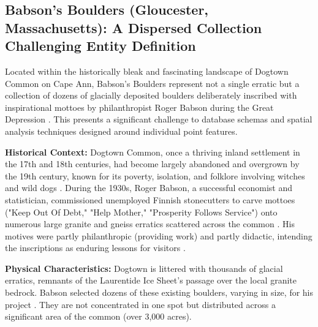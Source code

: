 \subsection{Babson's Boulders (Gloucester, Massachusetts): A Dispersed Collection Challenging Entity Definition}
\label{subsec:babson}

Located within the historically bleak and fascinating landscape of Dogtown Common on Cape Ann, Babson's Boulders represent not a single erratic but a collection of dozens of glacially deposited boulders deliberately inscribed with inspirational mottoes by philanthropist Roger Babson during the Great Depression \cite{Moore2005, wburMysteriousBoulders}. This presents a significant challenge to database schemas and spatial analysis techniques designed around individual point features.

\textbf{Historical Context:} Dogtown Common, once a thriving inland settlement in the 17th and 18th centuries, had become largely abandoned and overgrown by the 19th century, known for its poverty, isolation, and folklore involving witches and wild dogs \cite{Moore2005, Babson1940}. During the 1930s, Roger Babson, a successful economist and statistician, commissioned unemployed Finnish stonecutters to carve mottoes ("Keep Out Of Debt," "Help Mother," "Prosperity Follows Service") onto numerous large granite and gneiss erratics scattered across the common \cite{wburMysteriousBoulders}. His motives were partly philanthropic (providing work) and partly didactic, intending the inscriptions as enduring lessons for visitors \cite{Moore2005}.

\textbf{Physical Characteristics:} Dogtown is littered with thousands of glacial erratics, remnants of the Laurentide Ice Sheet's passage over the local granite bedrock. Babson selected dozens of these existing boulders, varying in size, for his project \cite{wburMysteriousBoulders}. They are not concentrated in one spot but distributed across a significant area of the common (over 3,000 acres).

